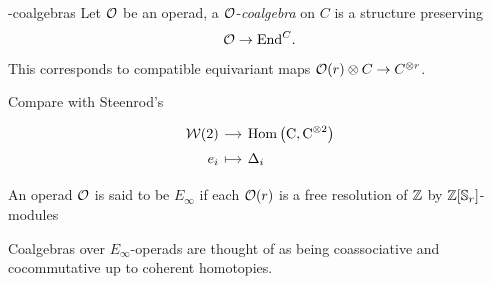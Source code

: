 \documentclass[10pt,t]{beamer} %
\begin{document}
\begin{frame}[fragile]{\pdfEinfty-coalgebras}
	Let $\mathcal{O}$ be an operad, a $\mathcal{O}$-\textit{coalgebra} on $C$ is a structure preserving
	\[
	\mathcal{O} \to \mathrm{End}^C.
	\]
	\pause This corresponds to compatible equivariant maps $\mathcal{O}(r) \otimes C \to C^{\otimes r}$.

	\medskip \pause	Compare with Steenrod's	\vspace*{-5pt}
	\[
	\begin{tikzcd}[%
	row sep=tiny,
	column sep = small,
	,row sep = 0ex
	,/tikz/column 1/.append style={anchor=base east}
	,/tikz/column 2/.append style={anchor=base west}
	]
	\cW(2) \arrow[r] & \Hom \left( \gchains, \gchains^{\otimes 2} \right) \\
	e_i \arrow[r, |->] & \Delta_i
	\end{tikzcd}
	\]

	\pause \vspace*{-10pt}
	\begin{definition}
		An operad $\mathcal{O}$ is said to be $E_\infty$ if each $\mathcal{O}(r)$ is a free resolution of $\mathbb{Z}$ by $\mathbb{Z}[\mathbb{S}_r]$-modules
	\end{definition}

	\smallskip \pause Coalgebras over $E_\infty$-operads are thought of as being coassociative and cocommutative up to coherent homotopies.
\end{frame}
\end{document}
